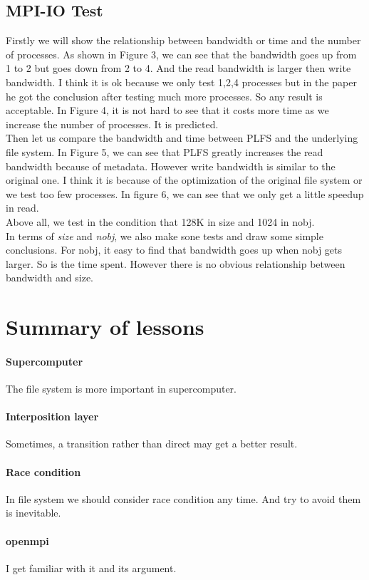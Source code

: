 \documentclass[conference]{IEEEtran}
\begin{document}
\subsection{MPI-IO Test}
Firstly we will show the relationship  between bandwidth or time and the number of processes. As shown in Figure 3, we can see that the bandwidth goes up from 1 to 2 but goes down from 2 to 4. And the read bandwidth is larger then write bandwidth. I think it is ok because we only test 1,2,4 processes but in the paper he got the conclusion after testing much more processes. So any result is acceptable. In Figure 4, it is not hard to see that it costs more time as we increase the number of processes. It is predicted.
\\Then let us compare the bandwidth and time between PLFS and the underlying file system. In Figure 5, we can see that PLFS greatly increases the read bandwidth because of metadata. However write bandwidth is similar to the original one. I think it is because of the optimization of the original file system or we test too few processes. In figure 6, we can see that we only get a little speedup in read. 
\\Above all, we test in the condition that 128K in size and 1024 in nobj.
\\In terms of \textit{size} and \textit{nobj}, we also make sone tests and draw some simple conclusions. For nobj, it easy to find that bandwidth goes up when nobj gets larger. So is the time spent. However there is no obvious relationship between bandwidth and size.

\section{Summary of lessons}
\paragraph{Supercomputer} The file system is more important in supercomputer. 
\paragraph{Interposition layer} Sometimes, a transition rather than direct may get a better result.
\paragraph{Race condition} In file system we should consider race condition any time. And try to avoid them is inevitable.
\paragraph{openmpi} I get familiar with it and its argument.
\end{document}
